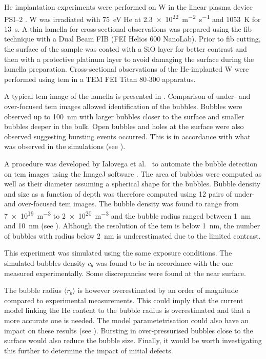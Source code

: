 He implantation experiments were performed on W in the linear plasma device PSI--2 .
W was irradiated with \SI{75}{eV} He at \SI{2.3e22}{m^{-2}.s^{-1}} and \SI{1053}{K} for \SI{13}{s}.
A thin lamella for cross-sectional observations was prepared using the \gls{fib} technique with a Dual Beam FIB (FEI Helios 600 NanoLab).
Prior to \gls{fib} cutting, the surface of the sample was coated with a SiO layer for better contrast and then with a protective platinum layer to avoid damaging the surface during the lamella preparation.
Cross-sectional observations of the He-implanted W were performed using \gls{tem} in a TEM FEI Titan 80-300 apparatus.

A typical \gls{tem} image of the lamella is presented in .
Comparison of under- and over-focused \gls{tem} images allowed identification of the bubbles.
Bubbles were observed up to \SI{100}{nm} with larger bubbles closer to the surface and smaller bubbles deeper in the bulk.
Open bubbles and holes at the surface were also observed suggesting bursting events occurred.
This is in accordance with what was observed in the simulations (see ).

A procedure was developed by Ialovega et al.\  to automate the bubble detection on \gls{tem} images using the ImageJ software .
The area of bubbles were computed as well as their diameter assuming a spherical shape for the bubbles.
Bubble density and size as a function of depth was therefore computed using 12 pairs of under- and over-focused \gls{tem} images.
The bubble density was found to range from \SI{7e19}{m^{-3}} to \SI{2e20}{m^{-3}} and the bubble radius ranged between \SI{1}{nm} and \SI{10}{nm} (see ).
Although the resolution of the \gls{tem} is below \SI{1}{nm}, the number of bubbles with radius below \SI{2}{nm} is underestimated due to the limited contrast.

This experiment was simulated using the same exposure conditions.
The simulated bubbles density $c_b$ was found to be in accordance with the one measured experimentally.
Some discrepancies were found at the near surface.

The bubble radius $\langle r_b \rangle$ is however overestimated by an order of magnitude compared to experimental measurements.
This could imply that the current model linking the He content to the bubble radius is overestimated and that a more accurate one is needed.
The model parametetrisation could also have an impact on these results (see ).
Bursting in over-pressurised bubbles close to the surface would also reduce the bubble size.
Finally, it would be worth investigating this further to determine the impact of initial defects.
